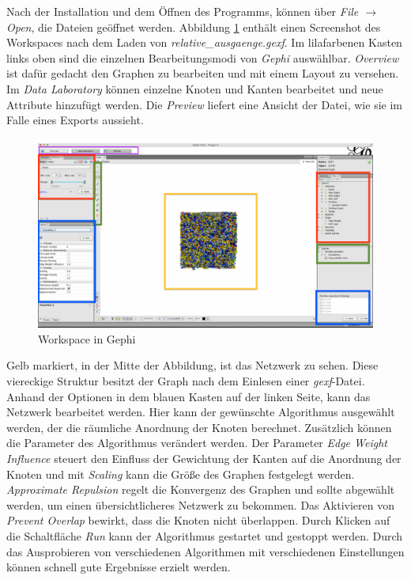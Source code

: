 Nach der Installation und dem Öffnen des Programms, können über \textit{File $ \rightarrow $ Open}, die Dateien geöffnet werden. Abbildung \ref{workspace} enthält einen Screenshot des Workspaces nach dem Laden von \textit{relative\_ausgaenge.gexf}. Im lilafarbenen Kasten links oben sind die einzelnen Bearbeitungsmodi von \textit{Gephi} auswählbar. \textit{Overview} ist dafür gedacht den Graphen zu bearbeiten und mit einem Layout zu versehen. Im \textit{Data Laboratory} können einzelne Knoten und Kanten bearbeitet und neue Attribute hinzufügt werden. Die \textit{Preview} liefert eine Ansicht der Datei, wie sie im Falle eines Exports aussieht.
\begin{figure}[H]
    \centering\includegraphics[scale=0.23]{workspace.png}\caption{Workspace in Gephi}\label{workspace}
\end{figure}
\noindent Gelb markiert, in der Mitte der Abbildung, ist das Netzwerk zu sehen. Diese viereckige Struktur besitzt der Graph nach dem Einlesen einer \textit{gexf}-Datei. Anhand der Optionen in dem blauen Kasten auf der linken Seite, kann das Netzwerk bearbeitet werden. Hier kann der gewünschte Algorithmus ausgewählt werden, der die räumliche Anordnung der Knoten berechnet. Zusätzlich können die Parameter des Algorithmus verändert werden. Der Parameter \textit{Edge Weight Influence} steuert den Einfluss der Gewichtung der Kanten auf die Anordnung der Knoten und mit \textit{Scaling} kann die Größe des Graphen festgelegt werden. \textit{Approximate Repulsion} regelt die Konvergenz des Graphen und sollte abgewählt werden, um einen übersichtlicheres Netzwerk zu bekommen. Das Aktivieren von \textit{Prevent Overlap} bewirkt, dass die Knoten nicht überlappen. Durch Klicken auf die Schaltfläche \textit{Run} kann der Algorithmus gestartet und gestoppt werden. Durch das Ausprobieren von verschiedenen Algorithmen mit verschiedenen Einstellungen können schnell gute Ergebnisse erzielt werden.\\
